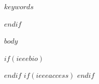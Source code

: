\documentclass[letterpaper, 10 pt, conference, twoside]{IEEEtran}
\begin{document}
\markboth{}{}

\begin{keywords}
    $keywords$
\end{keywords}
\titlepgskip=-15pt
\begin{abstract}
    $abstract$
\end{abstract}
\maketitle
$endif$


$body$

$if(ieeebio)$

$endif$
$if(ieeeaccess)$
\EOD
$endif$

\end{document}
